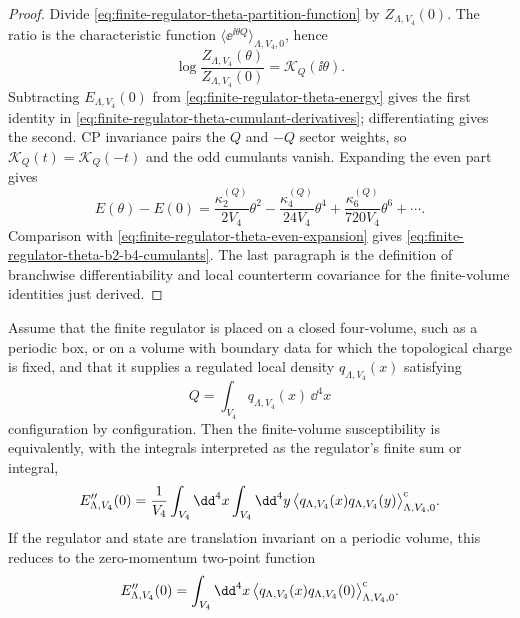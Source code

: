 \begin{proof}
Divide \eqref{eq:finite-regulator-theta-partition-function} by
\(Z_{\Lambda,V_4}(0)\).  The ratio is the characteristic function
\(\langle\ee^{\ii\theta Q}\rangle_{\Lambda,V_4,0}\), hence
\[
  \log\frac{Z_{\Lambda,V_4}(\theta)}{Z_{\Lambda,V_4}(0)}
  =
  \mathcal K_Q(\ii\theta).
\]
Subtracting \(E_{\Lambda,V_4}(0)\) from
\eqref{eq:finite-regulator-theta-energy} gives the first identity in
\eqref{eq:finite-regulator-theta-cumulant-derivatives}; differentiating gives
the second.  CP invariance pairs the \(Q\) and \(-Q\) sector weights, so
\(\mathcal K_Q(t)=\mathcal K_Q(-t)\) and the odd cumulants vanish.  Expanding
the even part gives
\[
  E(\theta)-E(0)
  =
  \frac{\kappa_2^{(Q)}}{2V_4}\theta^2
  -
  \frac{\kappa_4^{(Q)}}{24V_4}\theta^4
  +
  \frac{\kappa_6^{(Q)}}{720V_4}\theta^6+\cdots .
\]
Comparison with \eqref{eq:finite-regulator-theta-even-expansion} gives
\eqref{eq:finite-regulator-theta-b2-b4-cumulants}.  The last paragraph is the
definition of branchwise differentiability and local counterterm covariance
for the finite-volume identities just derived.
\end{proof}

\begin{proposition}
\label{prop:finite-regulator-susceptibility-density-cumulant}
Assume that the finite regulator is placed on a closed four-volume, such as a
periodic box, or on a volume with boundary data for which the topological
charge is fixed, and that it supplies a regulated local density
\(q_{\Lambda,V_4}(x)\) satisfying
\begin{equation}
  Q
  =
  \int_{V_4} q_{\Lambda,V_4}(x)\,\dd^4x
  \label{eq:finite-regulator-local-topological-charge}
\end{equation}
configuration by configuration.  Then the finite-volume susceptibility is
equivalently, with the integrals interpreted as the regulator's finite
sum or integral,
\begin{equation}
  E_{\Lambda,V_4}''(0)
  =
  \frac1{V_4}
  \int_{V_4}\dd^4x
  \int_{V_4}\dd^4y\,
  \bigl\langle
    q_{\Lambda,V_4}(x)q_{\Lambda,V_4}(y)
  \bigr\rangle_{\Lambda,V_4,0}^{\rm c}.
  \label{eq:finite-regulator-density-susceptibility}
\end{equation}
If the regulator and state are translation invariant on a periodic volume,
this reduces to the zero-momentum two-point function
\begin{equation}
  E_{\Lambda,V_4}''(0)
  =
  \int_{V_4}\dd^4x\,
  \bigl\langle
    q_{\Lambda,V_4}(x)q_{\Lambda,V_4}(0)
  \bigr\rangle_{\Lambda,V_4,0}^{\rm c}.
  \label{eq:periodic-density-susceptibility}
\end{equation}
\end{proposition}

